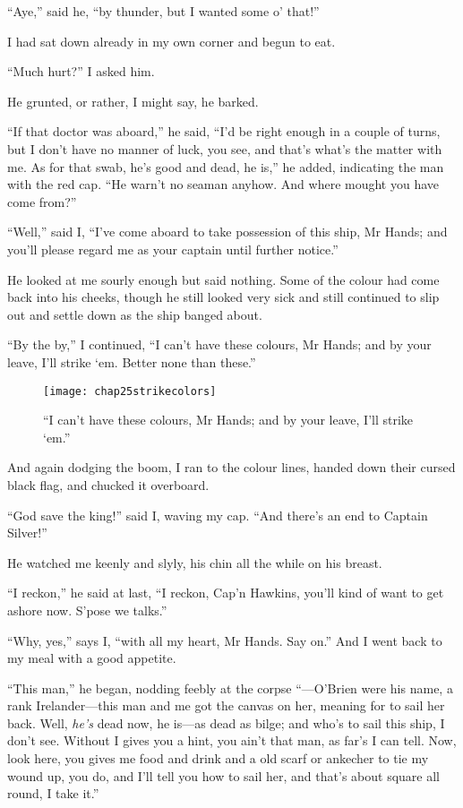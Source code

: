 \enquote{Aye,} said he, \enquote{by thunder, but I wanted some o’ that!}

I had sat down already in my own corner and begun to eat.

\enquote{Much hurt?} I asked him.

He grunted, or rather, I might say, he barked.

\enquote{If that doctor was aboard,} he said, \enquote{I’d be right enough in a couple of turns, but I don’t have no manner of luck, you see, and that’s what’s the matter with me. As for that swab, he’s good and dead, he is,} he added, indicating the man with the red cap. \enquote{He warn’t no seaman anyhow. And where mought you have come from?}

\enquote{Well,} said I, \enquote{I’ve come aboard to take possession of this ship, Mr Hands; and you’ll please regard me as your captain until further notice.}

He looked at me sourly enough but said nothing. Some of the colour had come back into his cheeks, though he still looked very sick and still continued to slip out and settle down as the ship banged about.

\enquote{By the by,} I continued, \enquote{I can’t have these colours, Mr Hands; and by your leave, I’ll strike `em. Better none than these.}

    \begin{figure}[p]
\centering
\texttt{[image: chap25strikecolors]}
\caption[\enquote{I can’t have these colours, Mr Hands}]{\enquote{I can’t have these colours, Mr Hands; and by your leave, I’ll strike `em.}}
\end{figure}   

And again dodging the boom, I ran to the colour lines, handed down their cursed black flag, and chucked it overboard.

\enquote{God save the king!} said I, waving my cap. \enquote{And there’s an end to Captain Silver!}

He watched me keenly and slyly, his chin all the while on his breast.

\enquote{I reckon,} he said at last, \enquote{I reckon, Cap’n Hawkins, you’ll kind of want to get ashore now. S’pose we talks.}

\enquote{Why, yes,} says I, \enquote{with all my heart, Mr Hands. Say on.} And I went back to my meal with a good appetite.

\enquote{This man,} he began, nodding feebly at the corpse \enquote{---O’Brien were his name, a rank Irelander---this man and me got the canvas on her, meaning for to sail her back. Well, \textit{he’s} dead now, he is---as dead as bilge; and who’s to sail this ship, I don’t see. Without I gives you a hint, you ain’t that man, as far’s I can tell. Now, look here, you gives me food and drink and a old scarf or ankecher to tie my wound up, you do, and I’ll tell you how to sail her, and that’s about square all round, I take it.}

